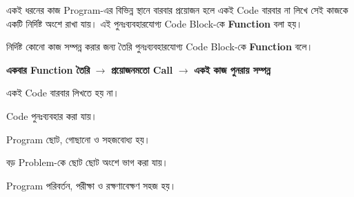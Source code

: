 
একই ধরনের কাজ Program-এর বিভিন্ন স্থানে বারবার প্রয়োজন হলে একই Code
বারবার না লিখে সেই কাজকে একটি নির্দিষ্ট অংশে রাখা যায়।
এই পুনঃব্যবহারযোগ্য Code Block-কে \textbf{Function} বলা হয়।



\begin{definitionbox}

নির্দিষ্ট কোনো কাজ সম্পন্ন করার জন্য তৈরি পুনঃব্যবহারযোগ্য
Code Block-কে \textbf{Function} বলে।

\end{definitionbox}

\begin{center}

\textbf{একবার Function তৈরি}
\(\longrightarrow\)
\textbf{প্রয়োজনমতো Call}
\(\longrightarrow\)
\textbf{একই কাজ পুনরায় সম্পন্ন}

\end{center}



\begin{compacttwocolpoints}

\item একই Code বারবার লিখতে হয় না।

\item Code পুনঃব্যবহার করা যায়।

\item Program ছোট, গোছানো ও সহজবোধ্য হয়।

\item বড় Problem-কে ছোট ছোট অংশে ভাগ করা যায়।

\item Program পরিবর্তন, পরীক্ষা ও রক্ষণাবেক্ষণ সহজ হয়।

\end{compacttwocolpoints}




